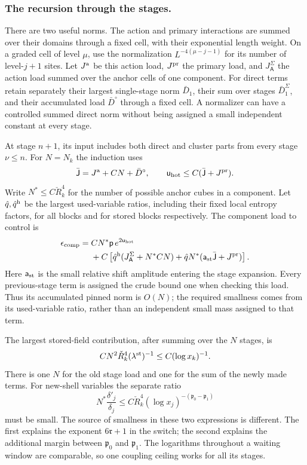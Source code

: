 \documentclass[11pt,letterpaper,reqno]{amsart}
\theoremstyle{definition}
\theoremstyle{remark}
\begin{document}
\subsubsection*{The recursion through the stages.}

There are two useful norms. The action and primary
interactions are summed over their domains through
a fixed cell, with their exponential length weight.
On a graded cell of level \(\mu\), use the normalization
\(L^{-4(\mu-j-1)}\) for its number of level-\(j+1\)
sites. Let \(J^{\rm a}\) be this action load,
\(J^{\rm pr}\) the primary load, and
\(J_{\mathsf A}^\Sigma\) the action load summed
over the anchor cells of one component.
For direct terms retain separately their largest
single-stage norm \(\bar D_1\), their sum over
stages \(\bar D_1^\Sigma\), and their accumulated
load \(\bar D^\circ\) through a fixed cell.
A normalizer can have a controlled summed direct
norm without being assigned a small independent
constant at every stage.

At stage \(n+1\), its input includes both direct
and cluster parts from every stage \(\nu\le n\).
For \(N=N_k\) the induction uses
\[
 \bar{\mathsf J}=J^{\rm a}+CN+\bar D^\circ,\qquad
 \mathsf u_{\rm hot}\le C(\bar{\mathsf J}+J^{\rm pr}).
\]
Write \(N^*\le C\check R_k^4\) for the number of
possible anchor cubes in a component. Let
\(\hat q,\hat q^{\rm h}\) be the largest
used-variable ratios, including their fixed local
entropy factors, for all blocks and for stored
blocks respectively. The component load to control
is
\begin{equation}\label{eq:stage-component-load}
 \begin{split}
 \epsilon_{\rm comp}={}&
 CN^*\mathsf p\,e^{2\mathsf u_{\rm hot}}\\
 &+C\left[
 \hat q^{\rm h}(J_{\mathsf A}^\Sigma+N^*CN)
       +\hat qN^*(\mathsf a_{\rm st}\bar{\mathsf J}+J^{\rm pr})\right].
 \end{split}
\end{equation}
Here \(\mathsf a_{\rm st}\) is the small relative
shift amplitude entering the stage expansion. Every previous-stage
term is assigned the crude bound one when
checking this load. Thus its accumulated pinned
norm is \(O(N)\); the required smallness comes
from its used-variable ratio, rather than an
independent small mass assigned to that term.

The largest stored-field contribution, after summing
over the \(N\) stages, is
\begin{equation}\label{eq:xrg-stage-accumulation}
 CN^2\check R_k^4(\lambda^{\rm st})^{-1}
                       \le C(\log x_k)^{-1}.
\end{equation}
There is one \(N\) for the old stage load and
one for the sum of the newly made terms.
For new-shell variables the separate ratio
\[
 N^*\frac{\delta'_j}{\delta_j}
       \le C\check R_k^4
                      (\log x_j)^{-(\mathfrak p_0-\mathfrak p_1)}
\]
must be small. The source of smallness in these
two expressions is different. The first explains
the exponent \(6\mathfrak r+1\) in the switch;
the second explains the additional margin
between \(\mathfrak p_0\) and \(\mathfrak p_1\).
The logarithms throughout a waiting window
are comparable, so one coupling ceiling works
for all its stages.
\end{document}
